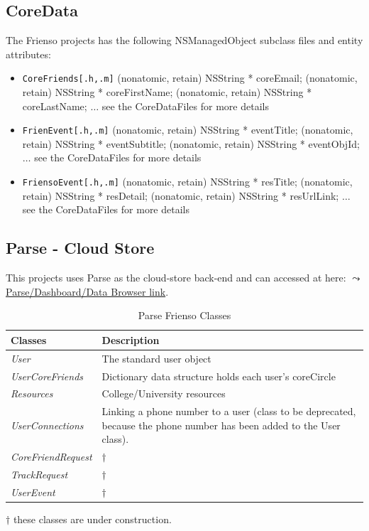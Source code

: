 \subsection{CoreData}
The Frienso projects has the following NSManagedObject subclass files and entity 
attributes:
\begin{itemize}
\item \texttt{CoreFriends[.h,.m]}
	\subitem \small{\@property (nonatomic, retain) NSString * coreEmail;}
	\subitem \small{\@property (nonatomic, retain) NSString * coreFirstName;}
	\subitem \small{\@property (nonatomic, retain) NSString * coreLastName;}
	\subitem \small{$\ldots$ see the CoreDataFiles for more details}
\item \texttt{FrienEvent[.h,.m]}
	\subitem \small{\@property (nonatomic, retain) NSString * eventTitle;}
	\subitem \small{\@property (nonatomic, retain) NSString * eventSubtitle;}
	\subitem \small{\@property (nonatomic, retain) NSString * eventObjId;}
	\subitem \small{$\ldots$ see the CoreDataFiles for more details}
\item \texttt{FriensoEvent[.h,.m]}
	\subitem \small{\@property (nonatomic, retain) NSString * resTitle;}
	\subitem \small{\@property (nonatomic, retain) NSString * resDetail;}
	\subitem \small{\@property (nonatomic, retain) NSString * resUrlLink;}
	\subitem \small{$\ldots$ see the CoreDataFiles for more details}\normalsize
\end{itemize}

\subsection{Parse - Cloud Store}
This projects uses Parse as the cloud-store back-end and can accessed at here: 
\href{https://www.parse.com/apps/frienso--2/collections}{$\leadsto$ Parse/Dashboard/Data Browser 
link}.

\begin{table}[ht!]%
	\caption{Parse Frienso Classes \label{tab:table_label}}
	\begin{tabularx}{\linewidth}{ l X }
	\textbf{Classes} & \textbf{Description} \\\hline
	\emph{User}  & The standard user object \\
	\emph{UserCoreFriends}  & Dictionary data structure holds each user's coreCircle \\
	\emph{Resources}        & College/University resources \\
	\emph{UserConnections}	& Linking a phone number to a user (class to be deprecated,
	because the phone number has been added to the User class).\\
	\emph{CoreFriendRequest}& $\dagger$\\
	\emph{TrackRequest} 	& $\dagger$\\
	\emph{UserEvent} 		& $\dagger$\\
	\end{tabularx}\end{table}%

\noindent \textbf{$\dagger$} these classes are under construction.



